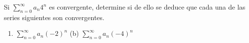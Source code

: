 \item Si $\displaystyle\sum_{n=0}^\infty a_n 4^n$ es convergente, determine si de ello se deduce que cada una de las series siguientes son convergentes.
    \begin{enumerate}
        \item[(a)] $\displaystyle\sum_{n=0}^\infty a_n (-2)^n$ \qquad\qquad\qquad (b) $\displaystyle\sum_{n=0}^\infty a_n (-4)^n$
    \end{enumerate}

